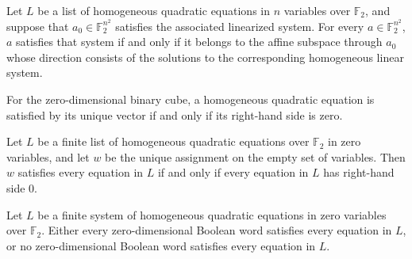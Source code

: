 \begin{theorem}
\label{FABL.satisfiesLinearized_iff_mem_binaryAffineSubspace}
\leanok
{}
Let $L$ be a list of homogeneous quadratic equations in $n$ variables over
$\mathbb{F}_2$, and suppose that $a_0\in\mathbb{F}_2^{n^2}$ satisfies the associated
linearized system. For every $a\in\mathbb{F}_2^{n^2}$, $a$ satisfies that system if and
only if it belongs to the affine subspace through $a_0$ whose direction consists of the
solutions to the corresponding homogeneous linear system.
\end{theorem}

\begin{theorem}
\label{FABL.homogeneousQuadraticEquation_satisfiedBy_zero_iff}
\leanok
{}
For the zero-dimensional binary cube, a homogeneous quadratic equation is satisfied by
its unique vector if and only if its right-hand side is zero.
\end{theorem}

\begin{theorem}
\label{FABL.satisfiesHomogeneousQuadraticSystem_zero_iff}
\leanok
{}
Let $L$ be a finite list of homogeneous quadratic equations over $\mathbb{F}_2$ in zero
variables, and let $w$ be the unique assignment on the empty set of variables. Then $w$
satisfies every equation in $L$ if and only if every equation in $L$ has right-hand side
$0$.
\end{theorem}

\begin{theorem}
\label{FABL.homogeneousQuadraticSystem_zero_universal_or_empty}
\leanok
{}
Let $L$ be a finite system of homogeneous quadratic equations in zero variables over
$\mathbb{F}_2$. Either every zero-dimensional Boolean word satisfies every equation in
$L$, or no zero-dimensional Boolean word satisfies every equation in $L$.
\end{theorem}

